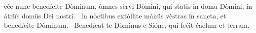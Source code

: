 \psalmChapterWithInscription{}
{ }
{%
cċe nunc benedícite Dòminum, òmnes sèrvi Dòmini, qui statis in domu Dòmini, in átriïs domüs Dei nostri. 
~In nòctibus extòllite mànüs vèstras in sancta, et benedícite Dòminum. 
~Benedícat te Dòminus e Sióne, qui feċit ċaelum et terram. 
}
